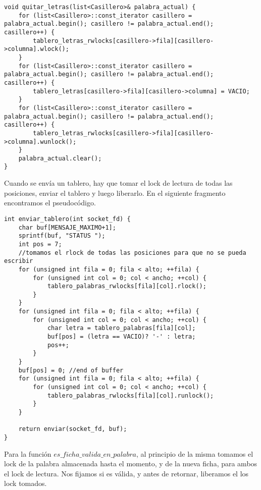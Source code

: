 \begin{lstlisting}
void quitar_letras(list<Casillero>& palabra_actual) {
    for (list<Casillero>::const_iterator casillero = palabra_actual.begin(); casillero != palabra_actual.end(); casillero++) {
        tablero_letras_rwlocks[casillero->fila][casillero->columna].wlock();
    }
    for (list<Casillero>::const_iterator casillero = palabra_actual.begin(); casillero != palabra_actual.end(); casillero++) {
        tablero_letras[casillero->fila][casillero->columna] = VACIO;
    }
    for (list<Casillero>::const_iterator casillero = palabra_actual.begin(); casillero != palabra_actual.end(); casillero++) {
        tablero_letras_rwlocks[casillero->fila][casillero->columna].wunlock();
    }
    palabra_actual.clear();
}
\end{lstlisting}

Cuando se envía un tablero, hay que tomar el lock de lectura de todas las posiciones, enviar el tablero y luego liberarlo. En el siguiente fragmento encontramos el pseudocódigo.

\begin{lstlisting}
int enviar_tablero(int socket_fd) {
    char buf[MENSAJE_MAXIMO+1];
    sprintf(buf, "STATUS ");
    int pos = 7;
    //tomamos el rlock de todas las posiciones para que no se pueda escribir
    for (unsigned int fila = 0; fila < alto; ++fila) {
        for (unsigned int col = 0; col < ancho; ++col) {
            tablero_palabras_rwlocks[fila][col].rlock();
        }
    }
    for (unsigned int fila = 0; fila < alto; ++fila) {
        for (unsigned int col = 0; col < ancho; ++col) {
            char letra = tablero_palabras[fila][col];
            buf[pos] = (letra == VACIO)? '-' : letra;
            pos++;
        }
    }
    buf[pos] = 0; //end of buffer
    for (unsigned int fila = 0; fila < alto; ++fila) {
        for (unsigned int col = 0; col < ancho; ++col) {
            tablero_palabras_rwlocks[fila][col].runlock();
        }
    }

    return enviar(socket_fd, buf);
}
\end{lstlisting}

Para la función $ es\_ficha\_valida\_en\_palabra $, al principio de la misma tomamos el lock de la palabra almacenada hasta el momento, y de la nueva ficha, para ambos el lock de lectura. Nos fijamos si es válida, y antes de retornar, liberamos el los lock tomados.

